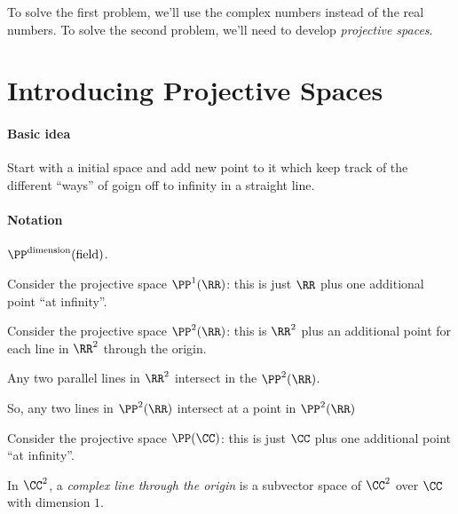 
To solve the first problem, we'll use the complex numbers instead of the real numbers. To solve the second problem, we'll need to develop \emph{projective spaces}.

\newpage
\section{Introducing Projective Spaces}

\paragraph{Basic idea} Start with a initial space and add new point to it which keep track of the different ``ways'' of goign off to infinity in a straight line. 

\paragraph{Notation} $\PP^{\text{dimension}}(\text{field})$.

\begin{exmp}
	Consider the projective space $\PP^1(\RR)$: this is just $\RR$ plus one additional point ``at infinity''.
\end{exmp}

\begin{exmp}
	Consider the projective space $\PP^2(\RR)$: this is  $\RR^2$ plus an additional point for each line in  $\RR^2$ through the origin.

	Any two parallel lines in $\RR^2$ intersect in the $\PP^2(\RR)$.

	So, any two lines in $\PP^2(\RR)$ intersect at a point in  $\PP^2(\RR)$
\end{exmp}

\begin{exmp}
	Consider the projective space $\PP(\CC)$: this is just $\CC$ plus one additional point ``at infinity''.
\end{exmp}

%

\begin{defn}
	In $\CC^2$, a \emph{complex line through the origin} is a subvector space of $\CC^2$ over $\CC$ with dimension $1$.
\end{defn}
